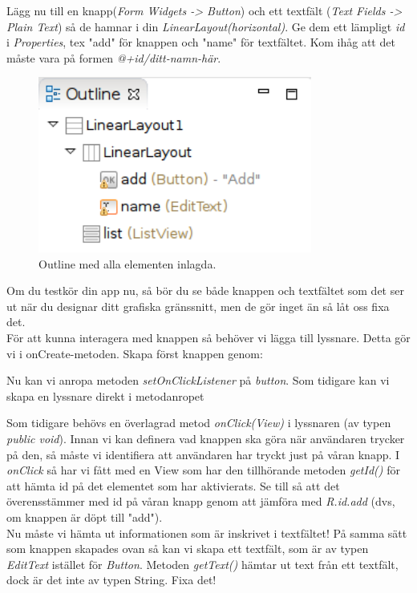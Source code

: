 \documentclass[11 pt, titlepage]{article} %
\begin{document}
Lägg nu till en knapp(\textit{Form Widgets -> Button}) och ett textfält (\textit{Text Fields -> Plain Text}) så de hamnar i din \textit{LinearLayout(horizontal)}. Ge dem ett lämpligt \textit{id} i \textit{Properties}, tex "add" för knappen och "name" för textfältet. Kom ihåg att det måste vara på formen \textit{@+id/ditt-namn-här}.\\

\begin{figure}[ht!]
\centering
\includegraphics[width=90mm]{images/outline.png}
\caption{Outline med alla elementen inlagda.}
\label{overflow}
\end{figure} 

Om du testkör din app nu, så bör du se både knappen och textfältet som det ser ut när du designar ditt grafiska gränssnitt, men de gör inget än så låt oss fixa det. \\

För att kunna interagera med knappen så behöver vi lägga till lyssnare. Detta gör vi i onCreate-metoden. Skapa först knappen genom: 

Nu kan vi anropa metoden \textit{setOnClickListener} på \textit{button}. Som tidigare kan vi skapa en lyssnare direkt i metodanropet


Som tidigare behövs en överlagrad metod \textit{onClick(View)} i lyssnaren (av typen \textit{public void}). Innan vi kan definera vad knappen ska göra när användaren trycker på den, så måste vi identifiera att användaren har tryckt just på våran knapp.
I \textit{onClick} så har vi fått med en View som har den tillhörande metoden \textit{getId()} för att hämta id på det elementet som har aktivierats. Se till så att det överensstämmer med id på våran knapp genom att jämföra med \textit{R.id.add} (dvs, om knappen är döpt till "add").\\

Nu måste vi hämta ut informationen som är inskrivet i textfältet! På samma sätt som knappen skapades ovan så kan vi skapa ett textfält, som är av typen \textit{EditText} istället för \textit{Button}.
Metoden \textit{getText()} hämtar ut text från ett textfält, dock är det inte av typen String. Fixa det!\\
\end{document}
